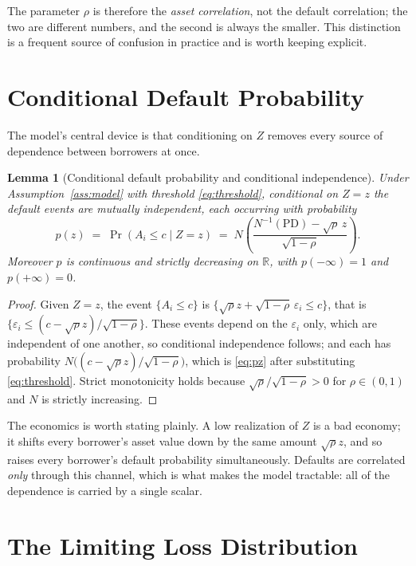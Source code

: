 \documentclass[11pt]{article}
\newtheorem{lemma}{Lemma}
\theoremstyle{remark}
\theoremstyle{definition}
\begin{document}
The parameter $\rho$ is therefore the \emph{asset correlation}, not the default correlation; the two are different numbers, and the second is always the smaller. This distinction is a frequent source of confusion in practice and is worth keeping explicit.

\section{Conditional Default Probability}
\label{sec:conditional}

The model's central device is that conditioning on $Z$ removes every source of dependence between borrowers at once.

\begin{lemma}[Conditional default probability and conditional independence]
\label{lem:conditional}
Under Assumption~\ref{ass:model} with threshold \eqref{eq:threshold}, conditional on $Z=z$ the default events are mutually independent, each occurring with probability
\begin{equation}
\label{eq:pz}
p(z) \;=\; \Pr(A_i \le c \mid Z=z) \;=\; N\!\left(\frac{N^{-1}(\text{PD}) - \sqrt{\rho}\,z}{\sqrt{1-\rho}}\right).
\end{equation}
Moreover $p$ is continuous and strictly decreasing on $\mathbb{R}$, with $p(-\infty)=1$ and $p(+\infty)=0$.
\end{lemma}

\begin{proof}
Given $Z=z$, the event $\{A_i \le c\}$ is $\{\sqrt{\rho}z + \sqrt{1-\rho}\,\varepsilon_i \le c\}$, that is $\{\varepsilon_i \le (c-\sqrt{\rho}z)/\sqrt{1-\rho}\}$. These events depend on the $\varepsilon_i$ only, which are independent of one another, so conditional independence follows; and each has probability $N\big((c-\sqrt{\rho}z)/\sqrt{1-\rho}\big)$, which is \eqref{eq:pz} after substituting \eqref{eq:threshold}. Strict monotonicity holds because $\sqrt{\rho}/\sqrt{1-\rho} > 0$ for $\rho \in (0,1)$ and $N$ is strictly increasing.
\end{proof}

The economics is worth stating plainly. A low realization of $Z$ is a bad economy; it shifts every borrower's asset value down by the same amount $\sqrt{\rho}z$, and so raises every borrower's default probability simultaneously. Defaults are correlated \emph{only} through this channel, which is what makes the model tractable: all of the dependence is carried by a single scalar.

\section{The Limiting Loss Distribution}
\label{sec:limit}
\end{document}
